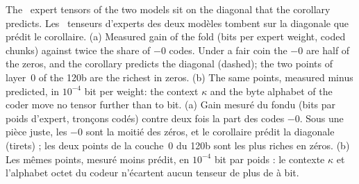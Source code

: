   {The \CodonNTenseurs\ expert tensors of the two models sit on the diagonal that the corollary predicts.}
  {Les \CodonNTenseurs\ tenseurs d'experts des deux modèles tombent sur la diagonale que prédit le corollaire.}
  {(a) Measured gain of the fold (bits per expert weight, coded chunks) against twice the share of $-0$ codes. Under a
   fair coin the $-0$ are half of the zeros, and the corollary predicts the diagonal (dashed); the two points of
   layer~0 of the 120b are the richest in zeros. (b) The same points, measured minus predicted, in $10^{-4}$ bit per
   weight: the context $\kappa$ and the byte alphabet of the coder move no tensor further than
   \CodonNum{\CodonNEcartMin} to \CodonNum{+\CodonNEcartMax} bit.}
  {(a) Gain mesuré du fondu (bits par poids d'expert, tronçons codés) contre deux fois la part des codes $-0$. Sous une
   pièce juste, les $-0$ sont la moitié des zéros, et le corollaire prédit la diagonale (tirets) ; les deux points de
   la couche~0 du 120b sont les plus riches en zéros. (b) Les mêmes points, mesuré moins prédit, en $10^{-4}$ bit par
   poids : le contexte $\kappa$ et l'alphabet octet du codeur n'écartent aucun tenseur de plus de
   \CodonNum{\CodonNEcartMin} à \CodonNum{+\CodonNEcartMax} bit.}

